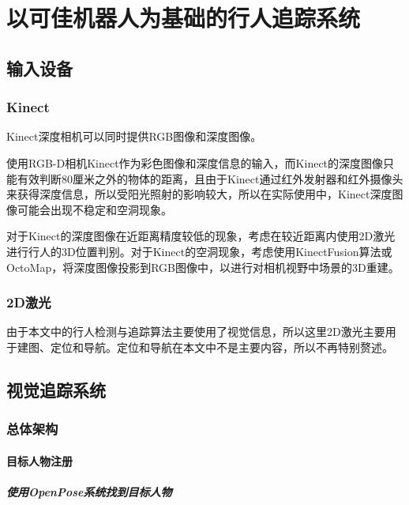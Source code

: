 
\chapter{以可佳机器人为基础的行人追踪系统}

\section{输入设备}

\subsection{Kinect}

  Kinect深度相机可以同时提供RGB图像和深度图像。

  使用RGB-D相机Kinect作为彩色图像和深度信息的输入，而Kinect的深度图像只能有效判断80厘米之外的物体的距离，且由于Kinect通过红外发射器和红外摄像头来获得深度信息，所以受阳光照射的影响较大，所以在实际使用中，Kinect深度图像可能会出现不稳定和空洞现象。

对于Kinect的深度图像在近距离精度较低的现象，考虑在较近距离内使用2D激光进行行人的3D位置判别。对于Kinect的空洞现象，考虑使用KinectFusion算法\cite{newcombe2011kinectfusion}或OctoMap\cite{hornung2013octomap}，将深度图像投影到RGB图像中，以进行对相机视野中场景的3D重建。

\subsection{2D激光}

  由于本文中的行人检测与追踪算法主要使用了视觉信息，所以这里2D激光主要用于建图、定位和导航。定位和导航在本文中不是主要内容，所以不再特别赘述。



\section{视觉追踪系统}
\subsection{总体架构}

\subsubsection{目标人物注册}
\paragraph{使用OpenPose系统找到目标人物}

